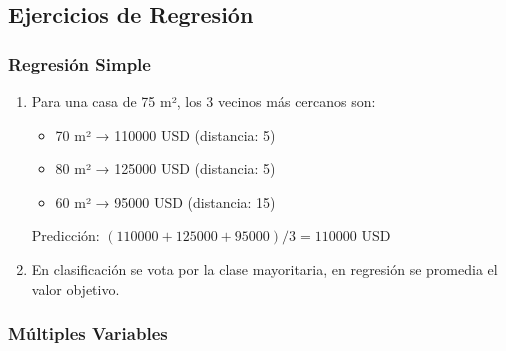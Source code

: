 \documentclass[12pt]{article}
\begin{document}
\subsection{Ejercicios de Regresión}

\subsubsection{Regresión Simple}

\begin{enumerate}
    \item Para una casa de 75 m², los 3 vecinos más cercanos son:
    \begin{itemize}
        \item 70 m² → 110000 USD (distancia: 5)
        \item 80 m² → 125000 USD (distancia: 5)
        \item 60 m² → 95000 USD (distancia: 15)
    \end{itemize}
    Predicción: $(110000 + 125000 + 95000) / 3 = 110000$ USD
    \item En clasificación se vota por la clase mayoritaria, en regresión se promedia el valor objetivo.
\end{enumerate}

\subsubsection{Múltiples Variables}
\end{document}
